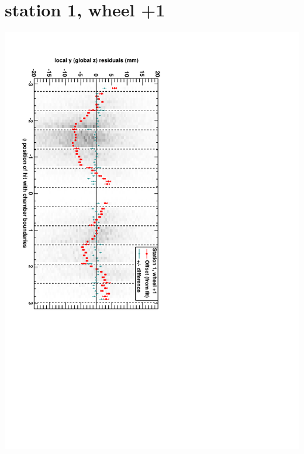 \documentclass[compress]{beamer}
\begin{document}
\section*{station 1, wheel +1}
\begin{frame} \vfill \mbox{\hspace{-1 cm}\includegraphics[height=1.2\linewidth, angle=90]{DTzVsPhi_st1_whD.pdf}} \end{frame}
\end{document}
